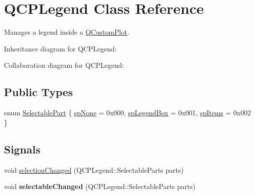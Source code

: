 \hypertarget{classQCPLegend}{}\section{Q\+C\+P\+Legend Class Reference}
\label{classQCPLegend}


Manages a legend inside a \hyperlink{classQCustomPlot}{Q\+Custom\+Plot}.  




Inheritance diagram for Q\+C\+P\+Legend\+:


Collaboration diagram for Q\+C\+P\+Legend\+:
\subsection*{Public Types}
\begin{DoxyCompactItemize}
\item 
enum \hyperlink{classQCPLegend_a5404de8bc1e4a994ca4ae69e2c7072f1}{Selectable\+Part} \{ \hyperlink{classQCPLegend_a5404de8bc1e4a994ca4ae69e2c7072f1a378201c07d500af7126e3ec91652eed7}{sp\+None} = 0x000, 
\hyperlink{classQCPLegend_a5404de8bc1e4a994ca4ae69e2c7072f1a0fa4758962a46fa1dc9da818abae23c4}{sp\+Legend\+Box} = 0x001, 
\hyperlink{classQCPLegend_a5404de8bc1e4a994ca4ae69e2c7072f1a768bfb95f323db4c66473375032c0af7}{sp\+Items} = 0x002
 \}
\end{DoxyCompactItemize}
\subsection*{Signals}
\begin{DoxyCompactItemize}
\item 
void \hyperlink{classQCPLegend_a82c88464edac07a9eefaf3906268df3b}{selection\+Changed} (Q\+C\+P\+Legend\+::\+Selectable\+Parts parts)
\item 
void {\bfseries selectable\+Changed} (Q\+C\+P\+Legend\+::\+Selectable\+Parts parts)\hypertarget{classQCPLegend_a8a77300fd0976d6bdd8000f4e8d114b8}{}\label{classQCPLegend_a8a77300fd0976d6bdd8000f4e8d114b8}

\end{DoxyCompactItemize}
